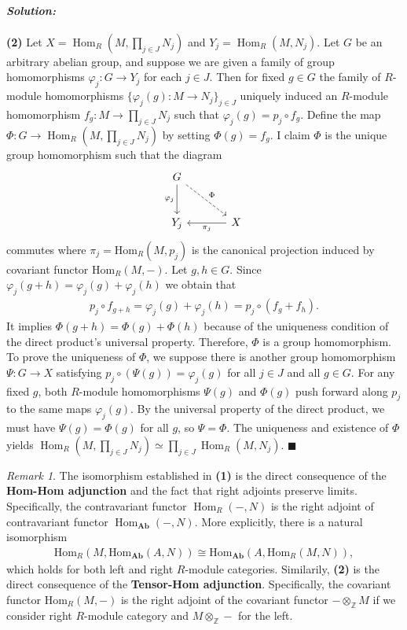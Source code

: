 \documentclass[12pt, a4paper]{article}
\theoremstyle{remark}
\newtheorem*{remark}{Remark}
\newenvironment{solution}
  {\paragraph{\textit{Solution:}}\par\medskip}
  {\hfill$\blacksquare$\vspace{0.1cm}}
\begin{document}
\begin{solution}
\textbf{(2)} Let $X=\operatorname{Hom}_R\left(M, \prod_{j\in J} N_j\right)$ and $Y_j=\operatorname{Hom}_R(M, N_j)$. Let $G$ be an arbitrary abelian group, and suppose we are given a family of group homomorphisms
$\varphi_j: G \to Y_j$ for each $j \in J$. Then for fixed $g\in G$ the family of $R$-module homomorphisms $\{\varphi_j(g):M\to N_j\}_{j\in J}$ uniquely induced an $R$-module homomorphism
$f_g:M \to \prod_{j\in J} N_j$ such that $\varphi_j(g)= p_j\circ f_g$. Define the map $\Phi:G \to \operatorname{Hom}_R\left(M, \prod_{j\in J} N_j\right)$ by setting $\Phi(g) = f_g$. I claim $\Phi$ is the unique group
homomorphism such that the diagram 
\[
\begin{tikzcd}[ampersand replacement=\&, row sep=large, column sep=large]
    G \arrow[d, "\varphi_j"'] \arrow[dr, "\Phi", dashed] \& \\
    Y_j \& X \arrow[l, "\pi_j"]
\end{tikzcd}
\]
commutes where $\pi_j=\text{Hom}_R(M,p_j)$ is the canonical projection induced by covariant functor $\text{Hom}_R(M,-)$. Let $g, h \in G$. Since $\varphi_j(g+h)= \varphi_j(g)+\varphi_j(h)$ we obtain that
\begin{align*}
    p_j\circ f_{g+h} = \varphi_j(g)+\varphi_j(h) = p_j\circ (f_{g}+f_{h}).
\end{align*}
It implies $\Phi(g+h)=\Phi(g)+\Phi(h)$ because of the uniqueness condition of the direct product's universal property.
Therefore, $\Phi$ is a group homomorphism. To prove the uniqueness of $\Phi$, we suppose
there is another group homomorphism $\Psi: G \to X$ satisfying $p_j\circ (\Psi(g))  = \varphi_j(g)$ for all $j \in J$ and all $g \in G$. For any fixed $g$, both $R$-module homomorphisms $\Psi(g)$ and $\Phi(g)$ push forward along $p_j$ to the same maps $\varphi_j(g)$. 
By the universal property of the direct product, we must have $\Psi(g) = \Phi(g)$ for all $g$, so $\Psi = \Phi$.
The uniqueness and existence of $\Phi$ yields $\operatorname{Hom}_R\left(M, \prod_{j\in J} N_j\right) \simeq \prod_{j\in J} \operatorname{Hom}_R(M, N_j)$.
\end{solution}
\begin{remark}
    The isomorphism established in \textbf{(1)} is the direct consequence of the \textbf{Hom-Hom adjunction} and the fact that right adjoints preserve limits. Specifically, 
    the contravariant functor $\operatorname{Hom}_R(-, N)$ is the right adjoint of contravariant functor $\operatorname{Hom}_{\textbf{Ab}}(-, N)$. 
    More explicitly, there is a natural isomorphism 
    \begin{align*}
        \text{Hom}_R(M,\text{Hom}_\textbf{Ab}(A,N)) \cong \text{Hom}_\textbf{Ab}(A,\text{Hom}_R(M,N)),
    \end{align*}
    which holds for both left and right $R$-module categories.
    Similarily, \textbf{(2)} is the direct consequence of the \textbf{Tensor-Hom adjunction}. Specifically, the covariant functor
    $\text{Hom}_R(M,-)$ is the right adjoint of the covariant functor $-\otimes_\mathbb{Z} M$ if we consider right $R$-module category and $M \otimes_\mathbb{Z} - $ for the left.
\end{remark}
\end{document}
